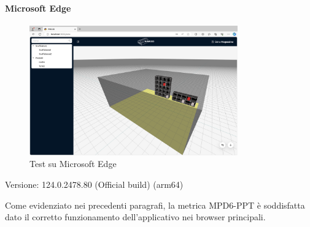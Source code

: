 \newpage

\paragraph{Microsoft Edge}
\begin{figure}[h!] 
    \centering
    \includegraphics[width=0.8\textwidth]{images/microsoftedge.png}
    \caption{Test su Microsoft Edge}
\end{figure}
Versione: 124.0.2478.80 (Official build) (arm64)

\vspace{3cm}
\noindent
Come evidenziato nei precedenti paragrafi, la metrica MPD6-PPT è soddisfatta dato il corretto funzionamento dell'applicativo nei browser principali. 

\newpage
